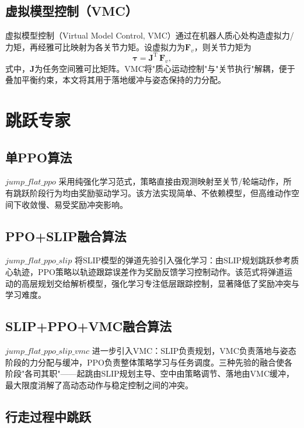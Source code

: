 \subsection{虚拟模型控制（VMC）}

虚拟模型控制（Virtual Model Control, VMC）\cite{pratt2001}通过在机器人质心处构造虚拟力/力矩，再经雅可比映射为各关节力矩。设虚拟力为$\boldsymbol{F}_{v}$，则关节力矩为
\begin{equation}
  \boldsymbol{\tau} = \boldsymbol{J}^{\mathrm{T}}\,\boldsymbol{F}_{v},
  \label{eq:vmc}
\end{equation}
式中，$\boldsymbol{J}$为任务空间雅可比矩阵。VMC将"质心运动控制"与"关节执行"解耦，便于叠加平衡约束，本文将其用于落地缓冲与姿态保持的力分配。

\section{跳跃专家}

\subsection{单PPO算法}

$jump\_flat\_ppo$ 采用纯强化学习范式，策略直接由观测映射至关节/轮端动作，所有跳跃阶段行为均由奖励驱动学习。该方法实现简单、不依赖模型，但高维动作空间下收敛慢、易受奖励冲突影响。

\subsection{PPO+SLIP融合算法}

$jump\_flat\_ppo\_slip$ 将SLIP模型的弹道先验引入强化学习：由SLIP规划跳跃参考质心轨迹，PPO策略以轨迹跟踪误差作为奖励反馈学习控制动作。该范式将弹道运动的高层规划交给解析模型，强化学习专注低层跟踪控制，显著降低了奖励冲突与学习难度。

\subsection{SLIP+PPO+VMC融合算法}

$jump\_flat\_ppo\_slip\_vmc$ 进一步引入VMC：SLIP负责规划，VMC负责落地与姿态阶段的力分配与缓冲，PPO负责整体策略学习与任务调度。三种先验的融合使各阶段"各司其职"——起跳由SLIP规划主导、空中由策略调节、落地由VMC缓冲，最大限度消解了高动态动作与稳定控制之间的冲突。

\subsection{行走过程中跳跃}

